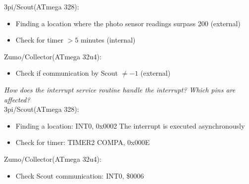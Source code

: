 \documentclass[12pt]{article}
\begin{document}
3pi/Scout(ATmega 328): \\
\begin{itemize}
\item Finding a location where the photo sensor readings surpass 200 (external)
\item Check for timer $> 5$ minutes (internal)
\end{itemize}
Zumo/Collector(ATmega 32u4): \\
\begin{itemize}
\item Check if communication by Scout $\neq -1$ (external)
\end{itemize} 

\flushleft
\textit{How does the interrupt service routine handle the interrupt? Which pins are affected?} \\

3pi/Scout(ATmega 328): \\
\begin{itemize}
\item Finding a location: INT0, 0x0002
The interrupt is executed asynchronously 
\item Check for timer: TIMER2 COMPA, 0x000E 
\end{itemize}
Zumo/Collector(ATmega 32u4): \\
\begin{itemize}
\item Check Scout communication: INT0, \$0006
\end{itemize}
\end{document}
